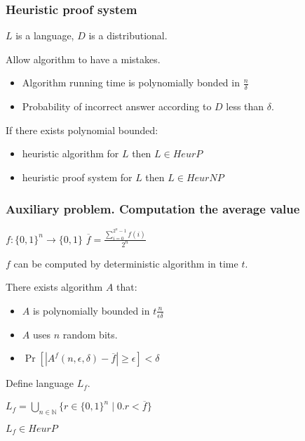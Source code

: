 \begin{frame}
    \frametitle{Heuristic proof system}

    $L$ is a language, $D$ is a distributional.

    Allow algorithm to have a mistakes.

    \begin{itemize}
	    \item Algorithm running time is polynomially bonded in $\frac{n}{\delta}$
    	\item Probability of incorrect answer according to $D$ less than $\delta$.
    \end{itemize}
    
    If there exists polynomial bounded:
    \begin{itemize}
        \item heuristic algorithm for $L$ then $L \in HeurP$
	    \item heuristic proof system for $L$ then $L \in HeurNP$
    \end{itemize}
    

    
\end{frame}

\begin{frame}
    \frametitle{Auxiliary problem. Computation the average value}

    $f:\{0, 1\}^{n} \rightarrow \{0, 1\}$
    $\overline{f} = \frac{\sum\limits_{i = 0}^{2^n - 1}f(i)}{2^n}$

    $f$ can be computed by deterministic algorithm in time $t$.

    \begin{statement}%
        There exists algorithm $A$ that:
        \begin{itemize}
	        \item $A$ is polynomially bounded in $t\frac{n}{\epsilon\delta}$
        	\item $A$ uses $n$ random bits.
        	\item $\Pr[|A^{f}(n, \epsilon, \delta) - \overline{f}| \ge \epsilon] <
		        \delta$
        \end{itemize}
    \end{statement}

    Define language $L_f$.

    $L_f = \bigcup\limits_{n \in \mathbb{N}}\{r \in \{0, 1\}^n \mid 0.r < \overline{f}\}$

    \begin{lemma}
        $L_f \in HeurP$
    \end{lemma}
\end{frame}


